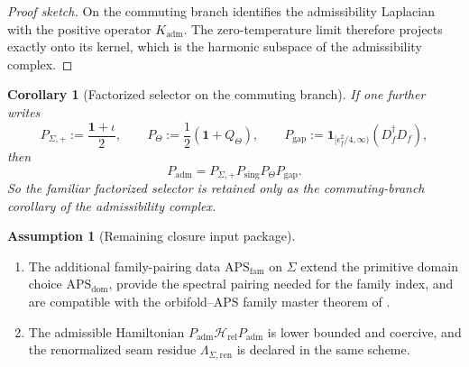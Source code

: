 \documentclass[11pt,a4paper]{article}
\newtheorem{corollary}[theorem]{Corollary}
\theoremstyle{definition}
\newtheorem{assumption}[theorem]{Assumption}
\theoremstyle{remark}
\newcommand{\Seam}{\Sigma}
\newcommand{\inv}{\iota}
\newcommand{\Hrel}{\mathcal H_{\mathrm{rel}}}
\newcommand{\Kadm}{K_{\mathrm{adm}}}
\newcommand{\APSdom}{\mathrm{APS}_{\mathrm{dom}}}
\newcommand{\APSfam}{\mathrm{APS}_{\mathrm{fam}}}
\newcommand{\Padm}{P_{\mathrm{adm}}}
\begin{document}
\begin{proof}[Proof sketch]
On the commuting branch  identifies the admissibility Laplacian with the positive operator $\Kadm$. The zero-temperature limit therefore projects exactly onto its kernel, which is the harmonic subspace of the admissibility complex.
\end{proof}

\begin{corollary}[Factorized selector on the commuting branch]
\label{cor:factorized-admissibility-selector}
If one further writes
\[
P_{\Seam,+}:=\frac{\mathbf 1+\inv}{2},
\qquad
P_\Theta:=\frac12(\mathbf 1+Q_\Theta),
\qquad
P_{\mathrm{gap}}:=\mathbf 1_{[\epsilon_f^2/4,\infty)}(D_f^\dagger D_f),
\]
then
\[
\Padm=P_{\Seam,+}P_{\mathrm{sing}}P_\Theta P_{\mathrm{gap}}.
\]
So the familiar factorized selector is retained only as the commuting-branch corollary of the admissibility complex.
\end{corollary}

\begin{assumption}[Remaining closure input package]
\label{ass:remaining-closure-inputs}
\begin{enumerate}[label=(\arabic*), leftmargin=1.5em, topsep=3pt, itemsep=2pt]
    \item The additional family-pairing data $\APSfam$ on $\Seam$ extend the primitive domain choice $\APSdom$, provide the spectral pairing needed for the family index, and are compatible with the orbifold--APS family master theorem of .
    \item The admissible Hamiltonian $\Padm\Hrel\Padm$ is lower bounded and coercive, and the renormalized seam residue $\Lambda_{\Seam,\mathrm{ren}}$ is declared in the same scheme.
\end{enumerate}
\end{assumption}
\end{document}
